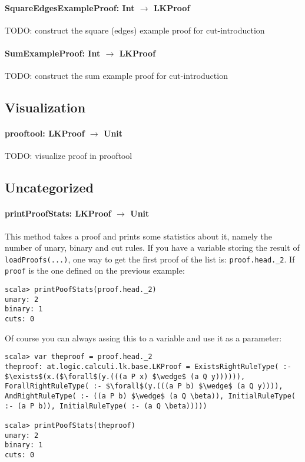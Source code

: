 \documentclass[a4paper, 11pt]{report}
\begin{document}
\paragraph{\textbf{SquareEdgesExampleProof: Int $\rightarrow$ LKProof}}
{\color{red}TODO}: construct the square (edges) example proof for cut-introduction

\paragraph{\textbf{SumExampleProof: Int $\rightarrow$ LKProof}}
{\color{red}TODO}: construct the sum example proof for cut-introduction

\subsection{Visualization}

\paragraph{\textbf{prooftool: LKProof $\rightarrow$ Unit}}
{\color{red}TODO}: visualize proof in prooftool

\subsection{Uncategorized}

\paragraph{\textbf{printProofStats: LKProof $\rightarrow$ Unit}}
This method takes a proof and prints some statistics about it, namely the number
of unary, binary and cut rules. If you have a variable storing the result of 
\texttt{loadProofs(...)}, one way to get the first proof of the list is: 
\texttt{proof.head.\_2}. If \texttt{proof} is the one defined on the previous 
example:

\begin{lstlisting}
scala> printPoofStats(proof.head._2)
unary: 2
binary: 1
cuts: 0
\end{lstlisting}

Of course you can always assing this to a variable and use it as a parameter:

\begin{lstlisting}
scala> var theproof = proof.head._2
theproof: at.logic.calculi.lk.base.LKProof = ExistsRightRuleType( :- $\exists$(x.($\forall$(y.(((a P x) $\wedge$ (a Q y)))))), ForallRightRuleType( :- $\forall$(y.(((a P b) $\wedge$ (a Q y)))), AndRightRuleType( :- ((a P b) $\wedge$ (a Q \beta)), InitialRuleType( :- (a P b)), InitialRuleType( :- (a Q \beta)))))

scala> printPoofStats(theproof)
unary: 2
binary: 1
cuts: 0
\end{lstlisting}
\end{document}
